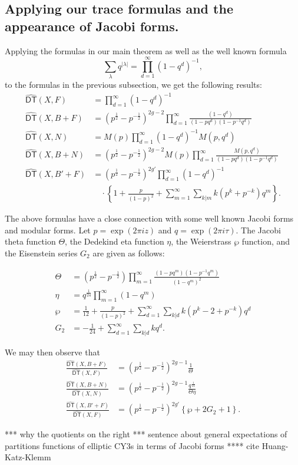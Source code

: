 \documentclass[12pt]{amsart}
\newcommand{\half}{\frac{1}{2}}
\theoremstyle{definition}
\newcommand{\DThat}{\operatorname{\widehat{\mathsf{DT}}}}
\begin{document}
\subsection{Applying our trace formulas and the appearance of Jacobi forms.}
Applying the formulas in our main theorem as well as the well known
formula
\[
\sum_{\lambda} q^{|\lambda |}= \prod_{d=1}^{\infty}(1-q^{d})^{-1},
\]
to the formulas in the previous subsection, we get the following
results:
\begin{align*}
\DThat (X,F)&= \prod_{d=1}^{\infty} (1-q^{d})^{-1}\\
\DThat (X,B+F)&= \left(p^{\half}-p^{-\half} \right)^{2g-2} \prod_{d=1}^{\infty}
\frac{(1-q^{d})}{(1-pq^{d})(1-p^{-1}q^{d})}\\
\DThat (X,N) &= M(p)\prod_{d=1}^{\infty} (1-q^{d})^{-1} M(p,q^{d})\\
\DThat (X,B+N) &=  \left(p^{\half}-p^{-\half} \right)^{2g-2} M(p)
\prod_{d=1}^{\infty} \frac{M(p,q^{d})}{(1-pq^{d})(1-p^{-1}q^{d})}\\
\DThat (X,B'+F) &=  \left(p^{\half}-p^{-\half}
\right)^{2g'}\prod_{d=1}^{\infty}(1-q^{d})^{-1}\\
&\quad \cdot 
\left\{1+\frac{p}{(1-p)^{2}}+\sum_{m=1}^{\infty} \sum_{k|m}
k(p^{k}+p^{-k})q^{m} \right\}. 
\end{align*}

The above formulas have a close connection with some well known Jacobi
forms and modular forms. Let $p=\exp\left(2\pi iz \right)$ and
$q=\exp\left(2\pi i\tau \right)$. The Jacobi theta function $\Theta$,
the Dedekind eta function $\eta$, the Weierstrass $\wp$ function, and
the Eisenstein series $G_{2}$ are given as follows:

\begin{align*}
\Theta &= \left(p^{\half}-p^{-\half} \right) \prod_{m=1}^{\infty}
\frac{(1-pq^{m})(1-p^{-1}q^{m})}{(1-q^{m})^{2}}\\
\eta &= q^{\frac{1}{24}}\prod_{m=1}^{\infty}(1-q^{m})\\
\wp &= \frac{1}{12} +\frac{p}{(1-p)^{2}} +\sum_{d=1}^{\infty}
\sum_{k|d} k(p^{k}-2+p^{-k}) q^{d}\\
G_{2} &= -\frac{1}{24} + \sum_{d=1}^{\infty} \sum_{k|d} k q^{d}.
\end{align*}

We may then observe that 
\begin{align*}
\frac{\DThat (X,B+F)}{\DThat (X,F)} &= \left(p^{\half}-p^{-\half}
\right)^{2g-1} \frac{1}{\Theta} \\
\frac{\DThat (X,B+N)}{\DThat (X,N)} &= \left(p^{\half}-p^{-\half}
\right)^{2g-1} \frac{q^{\frac{1}{24}}}{\Theta \eta } \\
\frac{\DThat (X,B'+F)}{\DThat (X,F)} &= \left(p^{\half}-p^{-\half}
\right)^{2g'} \left\{\wp +2G_{2} +1 \right\}.
\end{align*}

*** why the quotients on the right *** sentence about general
expectations of partitions functions of elliptic CY3s in terms of
Jacobi forms ****  cite Huang-Katz-Klemm

       


\end{document}
